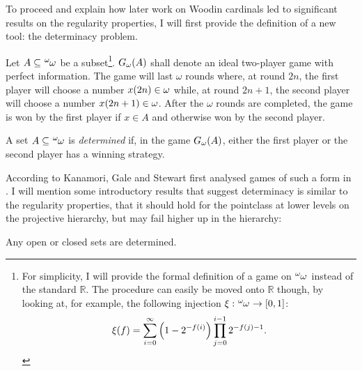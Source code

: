 \documentclass[12pt]{article}
\theoremstyle{plain}
\theoremstyle{definition}
\begin{document}
To proceed and explain how later work on Woodin cardinals led to significant results on the regularity properties, I will first provide the definition of a new tool: the determinacy problem.

\begin{definition}
	Let $A \subseteq \tensor*[^\omega]{\omega}{}$ be a subset\footnote{For simplicity, I will provide the formal definition of a game on $\tensor*[^\omega]{\omega}{}$ instead of the standard $\mathbb{R}$. The procedure can easily be moved onto $\mathbb{R}$ though, by looking at, for example, the following injection $\xi : \tensor*[^\omega]{\omega}{} \rightarrow \left[0, 1\right]$:
		\[\xi\mleft(f\mright) = \sum_{i = 0}^\infty \left(1 - 2^{-f\mleft(i\mright)}\right) \prod_{j = 0}^{i - 1} 2^{-f\mleft(j\mright) - 1}.\]}. $G_\omega\mleft(A\mright)$ shall denote an ideal two-player game with perfect information. The game will last $\omega$ rounds where, at round $2n$, the first player will choose a number $x\mleft(2n\mright) \in \omega$ while, at round $2n + 1$, the second player will choose a number $x\mleft(2n + 1\mright) \in \omega$. After the $\omega$ rounds are completed, the game is won by the first player if $x \in A$ and otherwise won by the second player.

	A set $A \subseteq \tensor*[^\omega]{\omega}{}$ is \emph{determined} if, in the game $G_\omega\mleft(A\mright)$, either the first player or the second player has a winning strategy.
\end{definition}

According to Kanamori, Gale and Stewart first analysed games of such a form in \cite{gale-stewart-infinite-games}. I will mention some introductory results that suggest determinacy is similar to the regularity properties, that it should hold for the pointclass at lower levels on the projective hierarchy, but may fail higher up in the hierarchy:

\begin{proposition}
	Any open or closed sets are determined.
\end{proposition}
\end{document}
